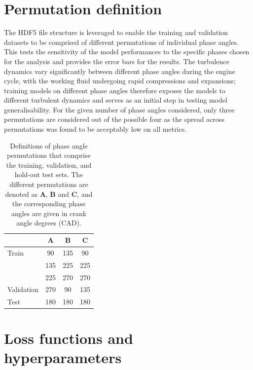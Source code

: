 \documentclass{article}
\begin{document}
\clearpage
\section{Permutation definition}
\label{app:perm}
The HDF5 file structure is leveraged to enable the training and validation datasets to be comprised of different permutations of individual phase angles. This tests the sensitivity of the model performances to the specific phases chosen for the analysis and provides the error bars for the results. The turbulence dynamics vary significantly between different phase angles during the engine cycle, with the working fluid undergoing rapid compressions and expansions; training models on different phase angles therefore exposes the models to different turbulent dynamics and serves as an initial step in testing model generalisability. For the given number of phase angles considered, only three permutations are considered out of the possible four as the spread across permutations was found to be acceptably low on all metrics.
\begin{table}[h]
  \caption{Definitions of phase angle permutations that comprise the training, validation, and hold-out test sets. The different permutations are denoted as \textbf{A}, \textbf{B} and \textbf{C}, and the corresponding phase angles are given in crank angle degrees (CAD).}
  \label{tab:perm}
  \centering
  \begin{tabular}{lccc}
    \toprule
         & \textbf{A}     & \textbf{B}  & \textbf{C}  \\
    \midrule
    Train  & 90  & 135 &  90 \\
              & 135 & 225 & 225 \\
              & 225 & 270 & 270 \\
    \midrule
    Validation & 270 & 90 & 135 \\
    \midrule
    Test  & 180 & 180 & 180 \\
    \bottomrule
  \end{tabular}
\end{table}

\section{Loss functions and hyperparameters}
\label{app:loss}

\end{document}
